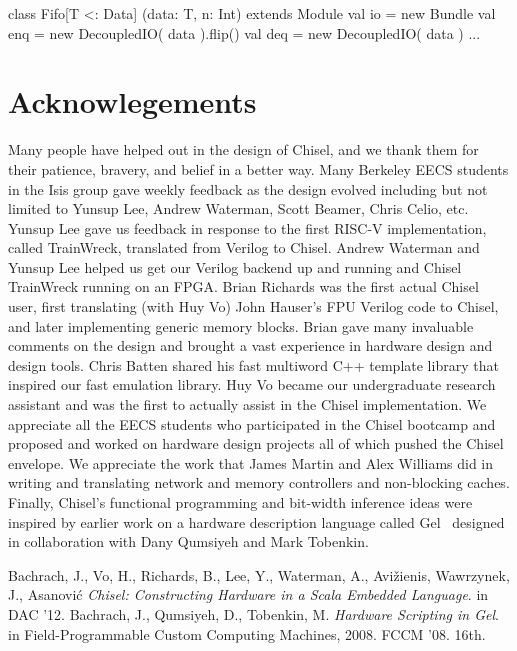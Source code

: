 \documentclass[twocolumn,10pt]{article}
\def\note#1{\noindent{\bf [Note: #1]}}
\begin{document}
\begin{scala}
class Fifo[T <: Data] (data: T, n: Int) 
    extends Module {
  val io = new Bundle {
    val enq = new DecoupledIO( data ).flip()
    val deq = new DecoupledIO( data )
  }
  ...
}
\end{scala}


\section{Acknowlegements}

Many people have helped out in the design of Chisel, and we thank them
for their patience, bravery, and belief in a better way.  Many
Berkeley EECS students in the Isis group gave weekly feedback as the
design evolved including but not limited to Yunsup Lee, Andrew
Waterman, Scott Beamer, Chris Celio, etc.  Yunsup Lee gave us feedback
in response to the first RISC-V implementation, called TrainWreck,
translated from Verilog to Chisel.  Andrew Waterman and Yunsup Lee
helped us get our Verilog backend up and running and Chisel TrainWreck
running on an FPGA.  Brian Richards was the first actual Chisel user,
first translating (with Huy Vo) John Hauser's FPU Verilog code to
Chisel, and later implementing generic memory blocks.  Brian gave many
invaluable comments on the design and brought a vast experience in
hardware design and design tools.  Chris Batten shared his fast
multiword C++ template library that inspired our fast emulation
library.  Huy Vo became our undergraduate research assistant and was
the first to actually assist in the Chisel implementation.  We
appreciate all the EECS students who participated in the Chisel
bootcamp and proposed and worked on hardware design projects all of
which pushed the Chisel envelope.  We appreciate the work that James
Martin and Alex Williams did in writing and translating network and
memory controllers and non-blocking caches.  Finally, Chisel's
functional programming and bit-width inference ideas were inspired by
earlier work on a hardware description language called Gel~\cite{gel} designed in
collaboration with Dany Qumsiyeh and Mark Tobenkin.


\begin{thebibliography}{50}
 Bachrach, J., Vo, H., Richards, B., Lee, Y., Waterman,
  A., Avi\v{z}ienis, Wawrzynek, J., Asanovi\'{c} \textsl{Chisel:
    Constructing Hardware in a Scala Embedded Language}.
in DAC '12.
 Bachrach, J., Qumsiyeh, D., Tobenkin, M. \textsl{Hardware Scripting in Gel}.
in Field-Programmable Custom Computing Machines, 2008. FCCM '08. 16th.
\end{thebibliography}
\end{document}
